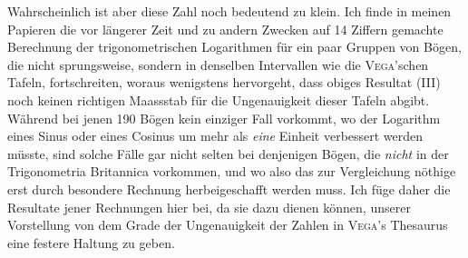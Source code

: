 Wahrscheinlich ist aber diese Zahl noch bedeutend zu klein. Ich finde in
meinen Papieren die vor längerer Zeit und zu andern Zwecken auf 14 Ziffern gemachte Berechnung der trigonometrischen Logarithmen für ein paar Gruppen von
Bögen, die nicht sprungsweise, sondern in denselben Intervallen wie die \textsc{Vega}'schen Tafeln, fortschreiten, woraus wenigstens hervorgeht, dass obiges Resultat
(III) noch keinen richtigen Maassstab für die Ungenauigkeit dieser Tafeln abgibt.
Während bei jenen 190 Bögen kein einziger Fall vorkommt, wo der Logarithm
eines Sinus oder eines Cosinus um mehr als \textit{eine} Einheit verbessert werden müsste,
sind solche Fälle gar nicht selten bei denjenigen Bögen, die \textit{nicht} in der Trigonometria Britannica vorkommen, und wo also das zur Vergleichung nöthige erst
durch besondere Rechnung herbeigeschafft werden muss. Ich füge daher die Resultate jener Rechnungen hier bei, da sie dazu dienen können, unserer Vorstellung von dem Grade der Ungenauigkeit der Zahlen in \textsc{Vega}'s Thesaurus eine festere Haltung zu geben.
